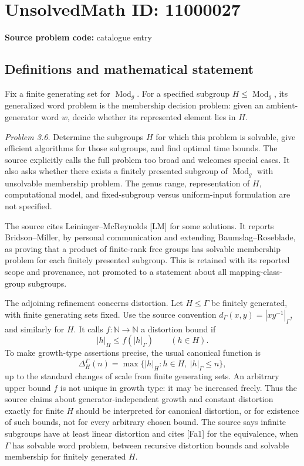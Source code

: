 \documentclass[11pt]{article}
\newcommand{\N}{\mathbb{N}}
\begin{document}
\section*{UnsolvedMath ID: 11000027}
\textbf{Source problem code:} catalogue entry
\subsection{Definitions and mathematical statement}
Fix a finite generating set for \(\operatorname{Mod}_g\). For a specified subgroup \(H\leq\operatorname{Mod}_g\), its generalized word problem is the membership decision problem: given an ambient-generator word \(w\), decide whether its represented element lies in \(H\).

\emph{Problem 3.6.} Determine the subgroups \(H\) for which this problem is solvable, give efficient algorithms for those subgroups, and find optimal time bounds. The source explicitly calls the full problem too broad and welcomes special cases. It also asks whether there exists a finitely presented subgroup of \(\operatorname{Mod}_g\) with unsolvable membership problem. The genus range, representation of \(H\), computational model, and fixed-subgroup versus uniform-input formulation are not specified.

The source cites Leininger--McReynolds [LM] for some solutions. It reports Bridson--Miller, by personal communication and extending Baumslag--Roseblade, as proving that a product of finite-rank free groups has solvable membership problem for each finitely presented subgroup. This is retained with its reported scope and provenance, not promoted to a statement about all mapping-class-group subgroups.

The adjoining refinement concerns distortion. Let \(H\leq\Gamma\) be finitely generated, with finite generating sets fixed. Use the source convention \(d_\Gamma(x,y)=|xy^{-1}|_\Gamma\), and similarly for \(H\). It calls \(f:\N\to\N\) a distortion bound if
\[
 |h|_H\leq f(|h|_\Gamma)\qquad(h\in H).
\]
To make growth-type assertions precise, the usual canonical function is
\[
 \Delta_H^\Gamma(n)=\max\{|h|_H:h\in H,\ |h|_\Gamma\leq n\},
\]
up to the standard changes of scale from finite generating sets. An arbitrary upper bound \(f\) is not unique in growth type: it may be increased freely. Thus the source claims about generator-independent growth and constant distortion exactly for finite \(H\) should be interpreted for canonical distortion, or for existence of such bounds, not for every arbitrary chosen bound. The source says infinite subgroups have at least linear distortion and cites [Fa1] for the equivalence, when \(\Gamma\) has solvable word problem, between recursive distortion bounds and solvable membership for finitely generated \(H\).
\end{document}
